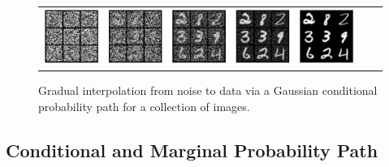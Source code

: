 \begin{figure}[h!]
    \centering
    \begin{tabular}{ccc}
         \includegraphics[width=\textwidth]{figures/noised_mnist_reversed.png} &
    \end{tabular}
    \caption{\label{fig:noising_image} Gradual interpolation from noise to data via  a Gaussian conditional probability path for a collection of images.}
\end{figure}

\subsection{Conditional and Marginal Probability Path}

